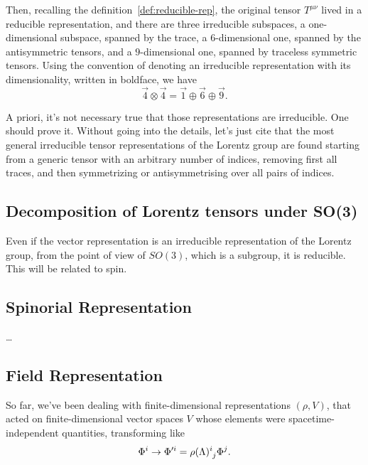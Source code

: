 Then, recalling the definition~\eqref{def:reducible-rep}, the original tensor $T^{\mu\nu}$ lived in a reducible representation, and there are three irreducible subspaces, a one-dimensional subspace, spanned by the trace, a $6$-dimensional one, spanned by the antisymmetric tensors, and a $9$-dimensional one, spanned by traceless symmetric tensors. Using the convention of denoting an irreducible representation with its dimensionality, written in boldface, we have
\begin{equation}
    \vec{4} \otimes \vec{4} = \vec{1} \oplus \vec{6} \oplus \vec{9} .
\end{equation}

A priori, it's not necessary true that those representations are irreducible. One should prove it. Without going into the details, let's just cite that the most general irreducible tensor representations of the Lorentz group are found starting from a generic tensor with an arbitrary number of indices, removing first all traces, and then symmetrizing or antisymmetrising over all pairs of indices.


\color{red}
\subsection{Decomposition of Lorentz tensors under SO(3)}
Even if the vector representation is an irreducible representation of the Lorentz group, from the point of view of $SO(3)$, which is a subgroup, it is reducible. This will be related to spin.




\subsection{Spinorial Representation}
\dots
\color{black}

\subsection{Field Representation}\label{sec:field-representation}
So far, we've been dealing with finite-dimensional representations $(\rho,V)$, that acted on finite-dimensional vector spaces $V$ whose elements were spacetime-independent quantities, transforming like
\begin{equation}\label{eq:transformation-field-component}
   \Phi^i \to  \Phi'^i  =  \tensor{\rho(\Lambda)}{^i_j} \Phi^j.
\end{equation}


